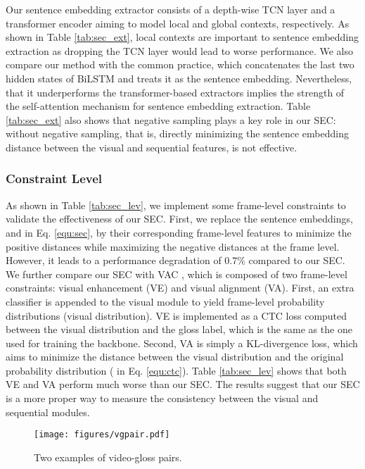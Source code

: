 \documentclass[acmsmall,screen]{acmart}
\begin{document}
Our sentence embedding extractor consists of a depth-wise TCN layer and a transformer encoder aiming to model local and global contexts, respectively.
As shown in Table \ref{tab:sec_ext}, local contexts are important to sentence embedding extraction as dropping the TCN layer would lead to worse performance.
We also compare our method with the common practice, which concatenates the last two hidden states of BiLSTM and treats it as the sentence embedding.
Nevertheless, that it underperforms the transformer-based extractors implies the strength of the self-attention mechanism for sentence embedding extraction.
Table \ref{tab:sec_ext} also shows that negative sampling plays a key role in our SEC: without negative sampling, that is, directly minimizing the sentence embedding distance between the visual and sequential features, is not effective.

\subsubsection{Constraint Level}
\label{sec:cons_lev}
As shown in Table \ref{tab:sec_lev}, we implement some frame-level constraints to validate the effectiveness of our SEC.
First, we replace the sentence embeddings,  and  in Eq. \ref{equ:sec}, by their corresponding frame-level features to minimize the positive distances while maximizing the negative distances at the frame level.
However, it leads to a performance degradation of 0.7\% compared to our SEC.
We further compare our SEC with VAC \cite{vac}, which is composed of two frame-level constraints: visual enhancement (VE) and visual alignment (VA).
First, an extra classifier is appended to the visual module to yield frame-level probability distributions (visual distribution).
VE is implemented as a CTC loss computed between the visual distribution and the gloss label, which is the same as the one used for training the backbone.
Second, VA is simply a KL-divergence loss, which aims to minimize the distance between the visual distribution and the original probability distribution ( in Eq. \ref{equ:ctc}).
Table \ref{tab:sec_lev} shows that both VE and VA perform much worse than our SEC.
The results suggest that our SEC is a more proper way to measure the consistency between the visual and sequential modules.

\begin{figure}[t]
	\centering
	\texttt{[image: figures/vgpair.pdf]}
	\caption{Two examples of video-gloss pairs.}
	\label{fig:vgpair}
\end{figure}
\end{document}
